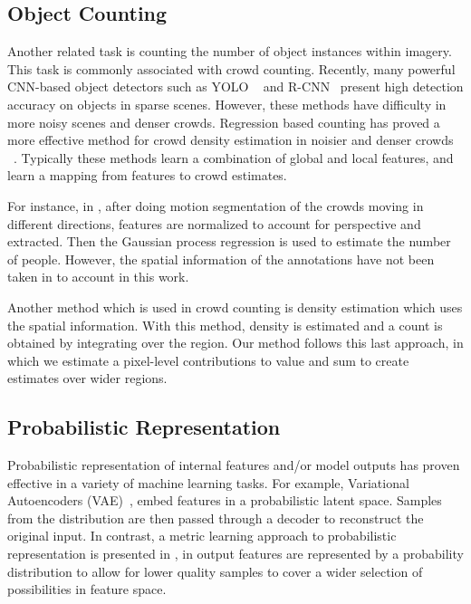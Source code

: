 \documentclass[10pt,twocolumn,letterpaper]{article}
\begin{document}



\subsection{Object Counting}

Another related task is counting the number of object instances within imagery. This task is commonly associated with crowd counting. Recently, many powerful CNN-based object detectors such as YOLO ~\cite{yolo} and R-CNN~\cite{Girshick2014RichFH} present high detection accuracy on objects in sparse scenes. However, these methods have difficulty in more noisy scenes and denser crowds. Regression based counting has proved a more effective method for crowd density estimation in noisier and denser crowds ~\cite{gao2020cnnbased}. Typically these methods learn a combination of global and local features, and learn a mapping from features to crowd estimates.

For instance, in \cite{chan2008privacy}, after doing motion segmentation of the crowds moving in different directions, features are normalized to account for perspective and extracted. Then the Gaussian process regression is used to estimate the number of people. However, the spatial information of the annotations have not been taken in to account in this work. 

Another method which is used in crowd counting is density estimation which uses the spatial information\cite{gao2020cnnbased, lempitsky2010learning}. With this method, density is estimated and a count is obtained by integrating over the region. Our method follows this last approach, in which we estimate a pixel-level contributions to value and sum to create estimates over wider regions.

\subsection{Probabilistic Representation}

Probabilistic representation of internal features and/or model outputs has proven effective in a variety of machine learning tasks. For example, Variational Autoencoders (VAE)~\cite{Kingma2014AutoEncodingVB}, embed features in a probabilistic latent space. Samples from the distribution are then passed through a decoder to reconstruct the original input. In contrast, a metric learning approach to probabilistic representation is presented in \cite{shi2019probabilistic}, in output features are represented by a probability distribution to allow for lower quality samples to cover a wider selection of possibilities in feature space.
\end{document}
